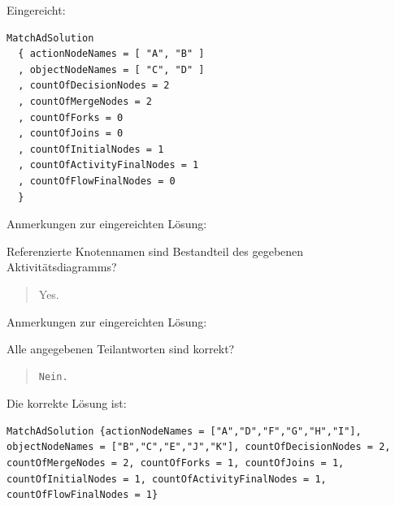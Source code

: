 Eingereicht:


\begin{verbatim}
MatchAdSolution 
  { actionNodeNames = [ "A", "B" ]
  , objectNodeNames = [ "C", "D" ]
  , countOfDecisionNodes = 2
  , countOfMergeNodes = 2
  , countOfForks = 0
  , countOfJoins = 0
  , countOfInitialNodes = 1
  , countOfActivityFinalNodes = 1
  , countOfFlowFinalNodes = 0 
  }
\end{verbatim}


Anmerkungen zur eingereichten Lösung:

Referenzierte Knotennamen sind Bestandteil des gegebenen Aktivitätsdiagramms?\begin{quote}Yes.\end{quote}Anmerkungen zur eingereichten Lösung:

Alle angegebenen Teilantworten sind korrekt?

\begin{quote}
\begin{verbatim}
Nein.
\end{verbatim}
\end{quote}

Die korrekte Lösung ist:
\begin{verbatim}
MatchAdSolution {actionNodeNames = ["A","D","F","G","H","I"], objectNodeNames = ["B","C","E","J","K"], countOfDecisionNodes = 2, countOfMergeNodes = 2, countOfForks = 1, countOfJoins = 1, countOfInitialNodes = 1, countOfActivityFinalNodes = 1, countOfFlowFinalNodes = 1}
\end{verbatim}


